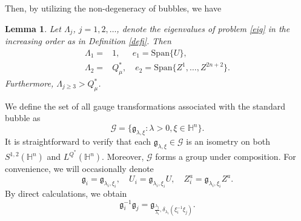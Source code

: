 \documentclass[11pt]{article}
\newtheorem{lemma}{Lemma}[section]
\begin{document}
Then, by utilizing the non-degeneracy of bubbles, we have
\begin{lemma}\label{eigen}\cite[Lemma 2.3]{ZXW25}
Let $\Lambda_j$, $j=1,2,\ldots$, denote the eigenvalues of problem \eqref{eig} in the increasing order as in Definition \ref{defi}. Then
\begin{align*}
  \Lambda_1=&1, \quad \ \  e_1=\mathrm{Span}\{U\},\\
  \Lambda_2=&Q_\mu^*, \quad e_2=\mathrm{Span}\big\{Z^1,\ldots,Z^{2n+2}\big\}.
\end{align*}
Furthermore, $\Lambda_{j\geq3}>Q_\mu^*$.
\end{lemma}

We define the set of all gauge transformations associated with the standard bubble as
\begin{equation*}%
\mathcal{G}=\big\{\mathfrak{g}_{\lambda, \xi}: \lambda >0, \xi \in \mathbb{H}^n\big\}.
\end{equation*}
It is straightforward to verify that each \(\mathfrak{g}_{\lambda, \xi} \in \mathcal{G}\) is an isometry on both $S^{1,2}(\mathbb{H}^{n})$ and $L^{Q^*}(\mathbb{H}^{n})$.
Moreover,
\(\mathcal{G}\) forms a group under composition.
For convenience, we will occasionally denote
  \begin{equation*}
 \mathfrak{g}_i= \mathfrak{g}_{\lambda_i, \xi_i}, \quad U_i=\mathfrak{g}_{\lambda_i, \xi_i} U, \quad Z_i^a= \mathfrak{g}_{\lambda_i, \xi_i} Z^a.
\end{equation*}
By direct calculations, we obtain %
\begin{equation}\label{rela}
\mathfrak{g}_i^{-1}\mathfrak{g}_{j}=\mathfrak{g}_{\frac{\lambda_j}{\lambda_i}, \delta_{\lambda_i}(\xi_i^{-1} \xi_j)}.
\end{equation}
\end{document}
